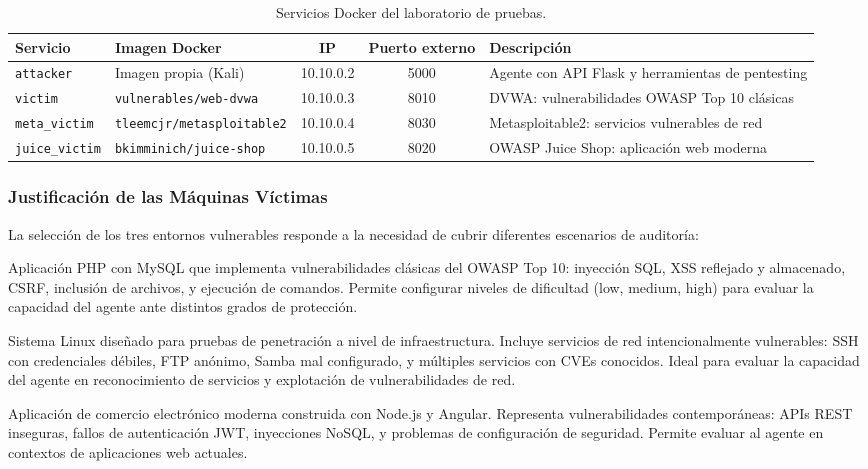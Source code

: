 \begin{table}[H]
\centering
\begin{adjustbox}{max width=\textwidth, max height=0.85\textheight, keepaspectratio}
\renewcommand{\arraystretch}{1.3}
\begin{tabular}{|l|l|c|c|p{3cm}|}
\hline
\rowcolor[gray]{0.85}
\textbf{Servicio} & \textbf{Imagen Docker} & \textbf{IP} & \textbf{Puerto externo} & \textbf{Descripción} \\
\hline
\texttt{attacker} & Imagen propia (Kali) & 10.10.0.2 & 5000 & Agente con API Flask y herramientas de pentesting \\
\hline
\texttt{victim} & \texttt{vulnerables/web-dvwa} & 10.10.0.3 & 8010 & DVWA: vulnerabilidades OWASP Top 10 clásicas \\
\hline
\texttt{meta\_victim} & \texttt{tleemcjr/metasploitable2} & 10.10.0.4 & 8030 & Metasploitable2: servicios vulnerables de red \\
\hline
\texttt{juice\_victim} & \texttt{bkimminich/juice-shop} & 10.10.0.5 & 8020 & OWASP Juice Shop: aplicación web moderna \\
\hline
\end{tabular}
\end{adjustbox}
\caption{Servicios Docker del laboratorio de pruebas.}
\label{tab:servicios_docker}
\end{table}

\subsubsection{Justificación de las Máquinas Víctimas}

La selección de los tres entornos vulnerables responde a la necesidad de cubrir diferentes escenarios de auditoría:

\begin{description}[style=nextline, leftmargin=1cm, font=\bfseries]
    \item[DVWA (Damn Vulnerable Web Application)]
    Aplicación PHP con MySQL que implementa vulnerabilidades clásicas del OWASP Top 10: inyección SQL, XSS reflejado y almacenado, CSRF, inclusión de archivos, y ejecución de comandos. Permite configurar niveles de dificultad (low, medium, high) para evaluar la capacidad del agente ante distintos grados de protección.
    
    \item[Metasploitable2]
    Sistema Linux diseñado para pruebas de penetración a nivel de infraestructura. Incluye servicios de red intencionalmente vulnerables: SSH con credenciales débiles, FTP anónimo, Samba mal configurado, y múltiples servicios con CVEs conocidos. Ideal para evaluar la capacidad del agente en reconocimiento de servicios y explotación de vulnerabilidades de red.
    
    \item[OWASP Juice Shop]
    Aplicación de comercio electrónico moderna construida con Node.js y Angular. Representa vulnerabilidades contemporáneas: APIs REST inseguras, fallos de autenticación JWT, inyecciones NoSQL, y problemas de configuración de seguridad. Permite evaluar al agente en contextos de aplicaciones web actuales.
\end{description}

